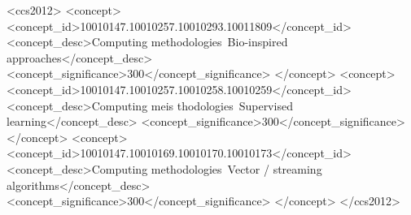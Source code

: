 \documentclass[sigconf]{acmart}
\begin{document}
\begin{CCSXML}
<ccs2012>
   <concept>
       <concept_id>10010147.10010257.10010293.10011809</concept_id>
       <concept_desc>Computing methodologies~Bio-inspired approaches</concept_desc>
       <concept_significance>300</concept_significance>
       </concept>
   <concept>
       <concept_id>10010147.10010257.10010258.10010259</concept_id>
       <concept_desc>Computing meis thodologies~Supervised learning</concept_desc>
       <concept_significance>300</concept_significance>
       </concept>
   <concept>
       <concept_id>10010147.10010169.10010170.10010173</concept_id>
       <concept_desc>Computing methodologies~Vector / streaming algorithms</concept_desc>
       <concept_significance>300</concept_significance>
       </concept>
 </ccs2012>
\end{CCSXML}



\maketitle
\end{document}
